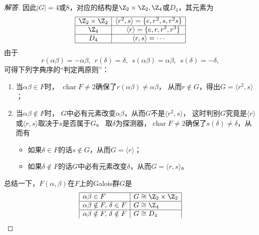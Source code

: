 \begin{enumerate}
\begin{proof}[解答]
    因此$|G|=4$或$8$，对应的结构是$\Z_2\times\Z_2,\Z_4$或$D_4$，其元素为
    $$\begin{array}{|c|c|}
    \hline \Z_2\times\Z_2 & \langle r^2,s \rangle=\{e,r^2,s,r^2s\}\\
    \hline \Z_4 & \ \ \ \ \langle r \rangle=\{e,r,r^2,r^3\}\\
    \hline D_4 & \langle r,s \rangle=\cdots\\
    \hline\end{array}$$
    由于
    \[r(\alpha\beta)=-\alpha\beta,\ \ r(\delta)=\delta,
    \ \ s(\alpha\beta)=\alpha\beta,\ \ s(\delta)=-\delta,\]
    可得下列字典序的``判定两原则''：
    \begin{enumerate}[label=(\alph*)]
    \item 当$\alpha\beta \in F$时，
    $\operatorname{char}F\ne2$确保了$r(\alpha\beta)\ne\alpha\beta$，
    从而$r \notin G$，得出$G=\langle r^2,s \rangle$；
    \item 当$\alpha\beta \notin F$时，
    $G$中必有元素改变$\alpha\beta$，从而$G$不是$\langle r^2,s \rangle$，
    这时判别$G$究竟是$\langle r \rangle$或$\langle r,s \rangle$取决于$s$是否属于$G$。
    取$\delta$为探测器，$\operatorname{char}F\ne2$确保了$s(\delta)\ne\delta$，从而有
    \begin{itemize}
        \item 如果$\delta \in F$的话$s \notin G$，从而$G=\langle r \rangle$；
        \item 如果$\delta \notin F$的话$G$中必有元素改变$\delta$，从而$G=\langle r,s \rangle$。
    \end{itemize}
    \end{enumerate}
    总结一下，$F(\alpha,\beta)$在$F$上的Galois群$G$是
    $$\begin{array}{|l|l|}
    \hline \alpha\beta \in F & G\cong\Z_2\times\Z_2\\
    \hline \alpha\beta \notin F,\,\delta \in F & G\cong\Z_4\\
    \hline \alpha\beta \notin F,\,\delta \notin F & G \cong D_4\\

\end{array}$$
\end{proof}
\end{enumerate}
